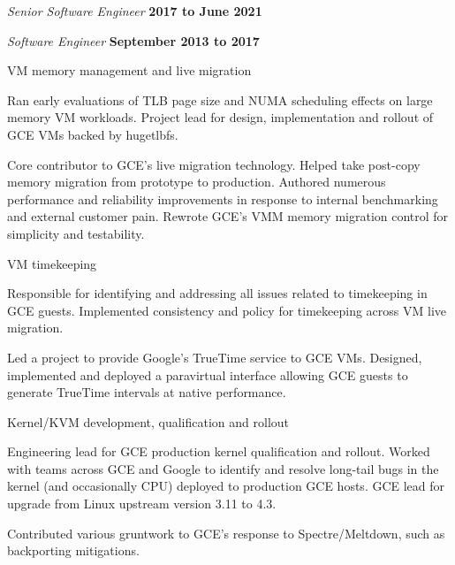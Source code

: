 \begin{outerlist}
\item[] \textit{Senior Software Engineer}%
   \hfill \textbf{2017 to June 2021}
\item[] \textit{Software Engineer}%
   \hfill \textbf{September 2013 to 2017}
   \begin{outerlist}
      \item VM memory management and live migration
      \begin{outerlist}
         \item Ran early evaluations of TLB page size and NUMA scheduling
         effects on large memory VM workloads. Project lead for design,
         implementation and rollout of GCE VMs backed by hugetlbfs.
         \item Core contributor to GCE's live migration technology. Helped take
         post-copy memory migration from prototype to production. Authored
         numerous performance and reliability improvements in response to
         internal benchmarking and external customer pain. Rewrote GCE's VMM
         memory migration control for simplicity and testability.
      \end{outerlist}
      \item VM timekeeping
      \begin{outerlist}
         \item Responsible for identifying and addressing all issues
         related to timekeeping in GCE guests. Implemented consistency and
         policy for timekeeping across VM live migration.
         \item Led a project to provide Google's TrueTime service to GCE VMs.
         Designed, implemented and deployed a paravirtual interface allowing
         GCE guests to generate TrueTime intervals at native performance.
      \end{outerlist}
      \item Kernel/KVM development, qualification and rollout
      \begin{outerlist}
         \item Engineering lead for GCE production kernel qualification and
         rollout. Worked with teams across GCE and Google to identify and
         resolve long-tail bugs in the kernel (and occasionally CPU)
         deployed to production GCE hosts. GCE lead for upgrade from
         Linux upstream version 3.11 to 4.3.
         \item Contributed various gruntwork to GCE's response to
         Spectre/Meltdown, such as backporting mitigations.

\end{outerlist}
\end{outerlist}
\end{outerlist}
